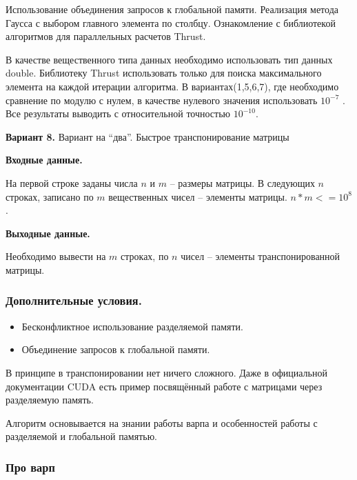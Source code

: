 \documentclass[12pt]{article}
\begin{document}


Использование объединения запросов к глобальной памяти.
Реализация метода Гаусса с выбором главного элемента по столбцу. Ознакомление с
библиотекой алгоритмов для параллельных расчетов Thrust.

\noindent
В качестве вещественного типа данных необходимо использовать тип данных
double. Библиотеку Thrust использовать только для поиска максимального элемента на
каждой итерации алгоритма. В вариантах(1,5,6,7), где необходимо сравнение по
модулю с нулем, в качестве нулевого значения использовать $10^{-7}$ . Все результаты
выводить с относительной точностью $10^{-10}$.

\textbf{Вариант 8.} Вариант на “два”. Быстрое транспонирование матрицы

\textbf{Входные данные.}

На первой строке заданы числа $n$ и $m$ -- размеры матрицы. В
следующих $n$ строках, записано по $m$ вещественных чисел -- элементы матрицы.
$n*m<=10^8$.

\textbf{Выходные данные.}

Необходимо вывести на $m$ строках, по $n$ чисел -- элементы
транспонированной матрицы.

\smallbreak

\subsubsection*{Дополнительные условия.}
\begin{itemize}
	\item Бесконфликтное использование разделяемой памяти.
	\item Объединение запросов к глобальной памяти.
\end{itemize}

\nvidia


В принципе в транспонировании нет ничего сложного.
Даже в официальной документации CUDA есть пример посвящённый работе с матрицами через разделяемую память.

Алгоритм основывается на знании работы варпа и особенностей работы с разделяемой и глобальной памятью.

\subsubsection*{Про варп}
\end{document}
